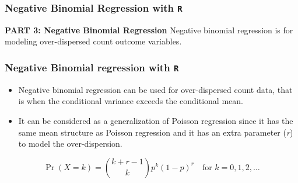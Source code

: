 \documentclass[MASTER.tex]{subfiles}
\begin{document}
\begin{frame}[fragile]
\frametitle{Negative Binomial Regression with \texttt{R}}
\LARGE
\textbf{PART 3: Negative Binomial Regression}
{
\Large
Negative binomial regression is for modeling over-dispersed count outcome variables.
}
\end{frame}
\begin{frame}[fragile]
\frametitle{Negative Binomial regression with \texttt{R}}
\large	
\begin{itemize}
		\item Negative binomial regression can be used for over-dispersed count data, that is when the conditional 
		variance exceeds the conditional mean. 
		\item It can be considered as a generalization of Poisson regression since it has the same mean structure as Poisson 	
		regression and it has an extra parameter (\textit{r}) to model the over-dispersion. 
\end{itemize}
\[\Pr(X = k) = {k+r-1 \choose k} p^k(1- p)^r \quad \mbox{for }k = 0, 1, 2, \dots \]
	
\end{frame}
\end{document}
